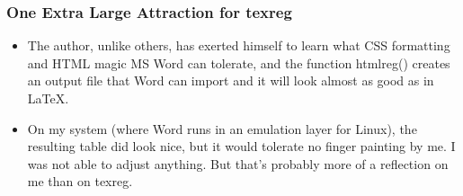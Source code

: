 \documentclass[11pt,english]{beamer}
\def\lyxframeend{} %
\begin{document}
\begin{frame}[containsverbatim]
\frametitle{One Extra Large Attraction for texreg}
\begin{itemize}
\item The author, unlike others, has exerted himself to learn what CSS formatting
and HTML magic MS Word can tolerate, and the function htmlreg() creates
an output file that Word can import and it will look almost as good
as in \LaTeX{}.
\item On my system (where Word runs in an emulation layer for Linux), the
resulting table did look nice, but it would tolerate no finger painting
by me. I was not able to adjust anything. But that's probably more
of a reflection on me than on texreg.
\end{itemize}
\end{frame}


\lyxframeend{}
\end{document}
